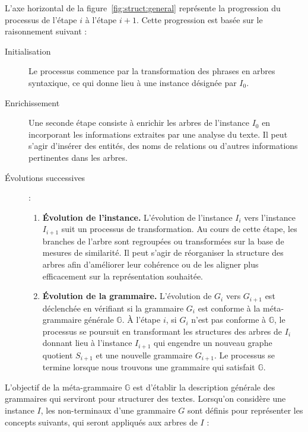 L'axe horizontal de la figure~\ref{fig:struct:general} représente la progression du processus de l'étape $i$ à l'étape $i+1$. Cette progression est basée sur le raisonnement suivant :
\begin{description}
    \item[Initialisation] Le processus commence par la transformation des phrases en arbres syntaxique, ce qui donne lieu à une instance désignée par $I_0$.

    \item[Enrichissement] Une seconde étape consiste à enrichir les arbres de l'instance $I_0$ en incorporant les informations extraites par une analyse du texte.
          Il peut s'agir d'insérer des entités, des noms de relations ou d'autres informations pertinentes dans les arbres.

    \item[Évolutions successives] :

          \begin{enumerate}
              \item \textbf{Évolution de l'instance.}
                    L'évolution de l'instance $I_i$ vers l'instance $I_{i+1}$ suit un processus de transformation.
                    Au cours de cette étape, les branches de l'arbre sont regroupées ou transformées sur la base de mesures de similarité. Il peut s'agir de réorganiser la structure des arbres afin d'améliorer leur cohérence ou de les aligner plus efficacement sur la représentation souhaitée.

              \item \textbf{Évolution de la grammaire.}
                    L'évolution de $G_i$ vers $G_{i+1}$ est déclenchée en vérifiant si la grammaire $G_i$ est conforme à la méta-grammaire générale $\mathbb{G}$.
                    À l'étape $i$, si $G_i$ n'est pas conforme à $\mathbb{G}$, le processus se poursuit en transformant les structures des arbres de $I_i$ donnant lieu à l'instance $I_{i+1}$ qui engendre un nouveau graphe quotient $S_{i+1}$ et une nouvelle grammaire $G_{i+1}$.
                    Le processus se termine lorsque nous trouvons une grammaire qui satisfait $\mathbb{G}$.
          \end{enumerate}
\end{description}

L'objectif de la méta-grammaire $\mathbb{G}$ est d'établir la description générale des grammaires qui serviront pour structurer des textes.
Lorsqu'on considère une instance $I$, les non-terminaux d'une grammaire $G$ sont définis pour représenter les concepts suivants, qui seront appliqués aux arbres de $I$ :

